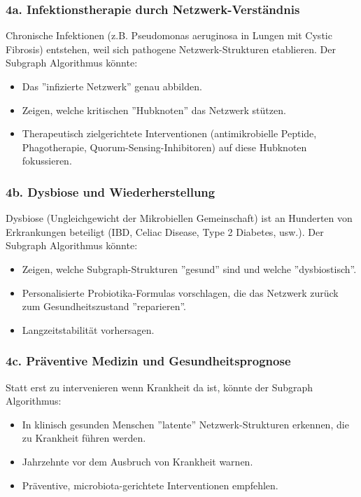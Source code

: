 \documentclass[a4paper,12pt]{article}
\theoremstyle{definition}
\begin{document}
\subsubsection{4a. Infektionstherapie durch Netzwerk-Verständnis}

Chronische Infektionen (z.B. Pseudomonas aeruginosa in Lungen mit Cystic Fibrosis) entstehen, weil sich pathogene Netzwerk-Strukturen etablieren. Der Subgraph Algorithmus könnte:
\begin{itemize}
    \item Das ''infizierte Netzwerk'' genau abbilden.
    \item Zeigen, welche kritischen ''Hubknoten'' das Netzwerk stützen.
    \item Therapeutisch zielgerichtete Interventionen (antimikrobielle Peptide, Phagotherapie, Quorum-Sensing-Inhibitoren) auf diese Hubknoten fokussieren.
\end{itemize}

\subsubsection{4b. Dysbiose und Wiederherstellung}

Dysbiose (Ungleichgewicht der Mikrobiellen Gemeinschaft) ist an Hunderten von Erkrankungen beteiligt (IBD, Celiac Disease, Type 2 Diabetes, usw.). Der Subgraph Algorithmus könnte:
\begin{itemize}
    \item Zeigen, welche Subgraph-Strukturen ''gesund'' sind und welche ''dysbiostisch''.
    \item Personalisierte Probiotika-Formulas vorschlagen, die das Netzwerk zurück zum Gesundheitszustand ''reparieren''.
    \item Langzeitstabilität vorhersagen.
\end{itemize}

\subsubsection{4c. Präventive Medizin und Gesundheitsprognose}

Statt erst zu intervenieren wenn Krankheit da ist, könnte der Subgraph Algorithmus:
\begin{itemize}
    \item In klinisch gesunden Menschen ''latente'' Netzwerk-Strukturen erkennen, die zu Krankheit führen werden.
    \item Jahrzehnte vor dem Ausbruch von Krankheit warnen.
    \item Präventive, microbiota-gerichtete Interventionen empfehlen.
\end{itemize}
\end{document}
